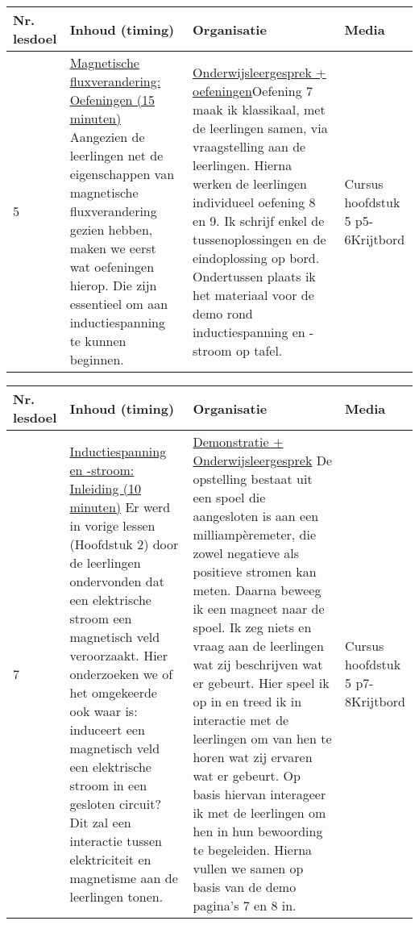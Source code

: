 \begin{landscape}
\begin{tabularx}{1.56\textwidth}{|p{1.5cm}|p{9cm}|X|p{4cm}|}
	\hline
	\textbf{Nr. lesdoel } & \textbf{Inhoud (timing)}  & \textbf{Organisatie } & \textbf{Media } \\ \hline
	5\newline\newline 6& \underline{Magnetische fluxverandering:} \underline{Oefeningen (15 minuten)}\newline
	Aangezien de leerlingen net de eigenschappen van magnetische fluxverandering gezien hebben, maken we eerst wat oefeningen hierop. Die zijn essentieel om aan inductiespanning te kunnen beginnen.
	&  \underline{Onderwijsleergesprek + oefeningen}\newline  Oefening 7 maak ik klassikaal, met de leerlingen samen, via vraagstelling aan de leerlingen. Hierna werken de leerlingen individueel oefening 8 en 9. Ik schrijf enkel de tussenoplossingen en de eindoplossing op bord. Ondertussen plaats ik het materiaal voor de demo rond inductiespanning en -stroom op tafel.
	&  Cursus hoofdstuk 5 p5-6\newline\newline Krijtbord
	\\ \hline
\end{tabularx}\vspace{5mm}



\begin{tabularx}{1.56\textwidth}{|p{1.5cm}|p{9cm}|X|p{4cm}|}
	\hline
	\textbf{Nr. lesdoel } & \textbf{Inhoud (timing)}  & \textbf{Organisatie } & \textbf{Media } \\ \hline
	7\newline\newline 8& \underline{Inductiespanning en -stroom:} \underline{Inleiding (10 minuten)}\newline
	Er werd in vorige lessen (Hoofdstuk 2) door de leerlingen ondervonden dat een elektrische stroom een magnetisch veld veroorzaakt. Hier onderzoeken we of het omgekeerde ook waar is: induceert een magnetisch veld een elektrische stroom in een gesloten circuit? Dit zal een interactie tussen elektriciteit en magnetisme aan de leerlingen tonen.
	&  \underline{Demonstratie + Onderwijsleergesprek}\newline 
	De opstelling bestaat uit een spoel die aangesloten is aan een milliampèremeter, die zowel negatieve als positieve stromen kan meten. Daarna beweeg ik een magneet naar de spoel. Ik zeg niets en vraag aan de leerlingen wat zij beschrijven wat er gebeurt. Hier speel ik op in en treed ik in interactie met de leerlingen om van hen te horen wat zij ervaren wat er gebeurt.	Op basis hiervan interageer ik met de leerlingen om hen in hun bewoording te begeleiden. Hierna vullen we samen op basis van de demo pagina's 7 en 8 in.
	&  Cursus hoofdstuk 5 p7-8\newline\newline Krijtbord
	\\ \hline
\end{tabularx}\vspace{5mm}





\end{landscape}
